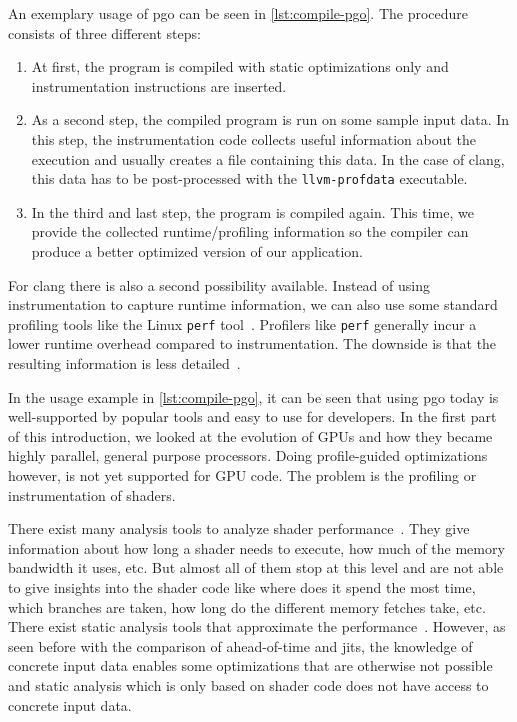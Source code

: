 

An exemplary usage of \gls{pgo} can be seen in \cref{lst:compile-pgo}. The procedure consists of three different steps:
\begin{enumerate}
	\item At first, the program is compiled with static optimizations only and instrumentation instructions are inserted.
	\item As a second step, the compiled program is run on some sample input data. In this step, the instrumentation code collects useful information about the execution and usually creates a file containing this data. In the case of clang, this data has to be post-processed with the \texttt{llvm-profdata} executable.
	\item In the third and last step, the program is compiled again. This time, we provide the collected runtime/profiling information so the compiler can produce a better optimized version of our application.
\end{enumerate}

For clang there is also a second possibility available. Instead of using instrumentation to capture runtime information, we can also use some standard profiling tools like the Linux \texttt{perf} tool~\cite{LinuxPerf}. Profilers like \texttt{perf} generally incur a lower runtime overhead compared to instrumentation. The downside is that the resulting information is less detailed~\cite{ClangManual}.

In the usage example in \cref{lst:compile-pgo}, it can be seen that using \gls{pgo} today is well-supported by popular tools and easy to use for developers. In the first part of this introduction, we looked at the evolution of GPUs and how they became highly parallel, general purpose processors. Doing profile-guided optimizations however, is not yet supported for GPU code. The problem is the profiling or instrumentation of shaders.

There exist many analysis tools to analyze shader performance~\cite{RenderDoc, NvidiaShaderPerf}. They give information about how long a shader needs to execute, how much of the memory bandwidth it uses, etc. But almost all of them stop at this level and are not able to give insights into the shader code like where does it spend the most time, which branches are taken, how long do the different memory fetches take, etc. There exist static analysis tools that approximate the performance~\cite{AMDShaderAnalyzer}. However, as seen before with the comparison of ahead-of-time and \glspl{jit}, the knowledge of concrete input data enables some optimizations that are otherwise not possible and static analysis which is only based on shader code does not have access to concrete input data.


